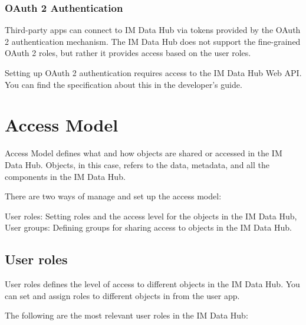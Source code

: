 \documentclass[]{book}
\begin{document}
\hypertarget{oauth-2-authentication}{%
\subsubsection{OAuth 2 Authentication}\label{oauth-2-authentication}}

Third-party apps can connect to IM Data Hub via tokens provided by the OAuth 2 authentication mechanism. The IM Data Hub does not support the fine-grained OAuth 2 roles, but rather it provides access based on the user roles.

Setting up OAuth 2 authentication requires access to the IM Data Hub Web API. You can find the specification about this in the developer's guide.

\hypertarget{access-model}{%
\section{Access Model}\label{access-model}}

Access Model defines what and how objects are shared or accessed in the IM Data Hub. Objects, in this case, refers to the data, metadata, and all the components in the IM Data Hub.

There are two ways of manage and set up the access model:

User roles: Setting roles and the access level for the objects in the IM Data Hub,
User groups: Defining groups for sharing access to objects in the IM Data Hub.

\hypertarget{user-roles}{%
\subsection{User roles}\label{user-roles}}

User roles defines the level of access to different objects in the IM Data Hub. You can set and assign roles to different objects in from the user app.

The following are the most relevant user roles in the IM Data Hub:
\end{document}
